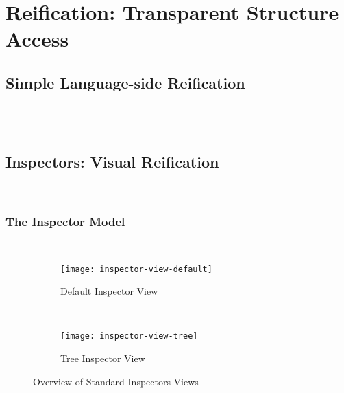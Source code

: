 
\chapter{Reification: Transparent Structure Access}
\minitoc
\introduction



\newpage
\section{Simple Language-side Reification}
 \\
 \\


\section{Inspectors: Visual Reification}
 \\

\subsection{The Inspector Model}
 \\



\begin{figure}[h]
	\centering
	\begin{subfigure}[t]{\textwidth}
		\centering
		\texttt{[image: inspector-view-default]}
		\caption{Default Inspector View}
	\end{subfigure}\\
	\vspace{\baselineskip}
	\begin{subfigure}[t]{\textwidth}
		\centering
		\texttt{[image: inspector-view-tree]}
		\caption{Tree Inspector View}
	\end{subfigure} 

	\caption{Overview of Standard Inspectors Views}
\end{figure}

